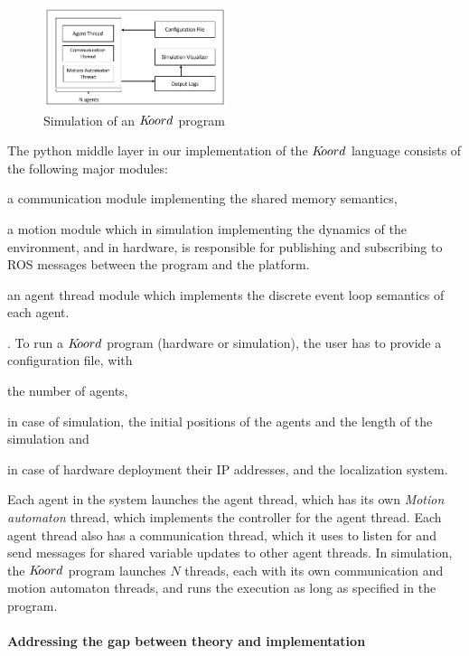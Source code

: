 \begin{figure}[h!]
\centering
\includegraphics[width=0.48\textwidth]{figs/simulationengine.png}
\caption{Simulation of an $K\kern-2pt oord$ program }
\label{fig:simfig}
\end{figure}
The python middle layer in our implementation of the $K\kern-2pt oord$ language consists of the following major modules:\begin{inparaenum}
\item a communication module implementing the shared memory semantics,\item a motion module which in simulation implementing the dynamics of the environment, and in hardware, is responsible for publishing and subscribing to ROS messages between the program and the platform. \item an agent thread module which implements the discrete event loop semantics of each agent. 
\end{inparaenum}. To run a $K\kern-2pt oord$ program (hardware or simulation), the user has to provide a configuration file, with \begin{inparaenum}\item the number of agents, \item in case of simulation, the initial positions of the agents and the length of the simulation and \item in case of hardware deployment their IP addresses, and the localization system.\end{inparaenum} Each agent in the system launches the agent thread, which has its own \emph{Motion automaton} thread, which implements the controller for the agent thread. Each agent thread also has a communication thread, which it uses to listen for and send messages for shared variable updates to other agent threads. In simulation, the $K\kern-2pt oord$ program launches $N$ threads, each with its own communication and motion automaton threads, and runs the execution as long as specified in the program.


\paragraph{Addressing the gap between theory and implementation}

